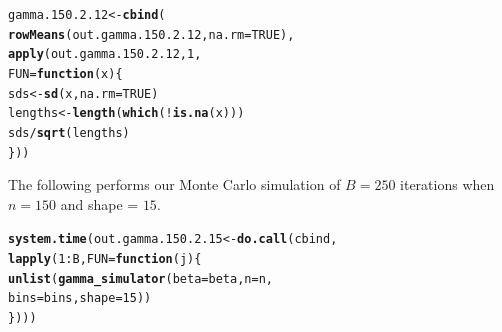 \documentclass[11pt]{article}\usepackage[]{graphicx}\usepackage[]{color}
\makeatletter
\newcommand{\hlnum}[1]{\textcolor[rgb]{0.686,0.059,0.569}{#1}}%
\newcommand{\hlopt}[1]{\textcolor[rgb]{0,0,0}{#1}}%
\newcommand{\hlstd}[1]{\textcolor[rgb]{0.345,0.345,0.345}{#1}}%
\newcommand{\hlkwa}[1]{\textcolor[rgb]{0.161,0.373,0.58}{\textbf{#1}}}%
\newcommand{\hlkwb}[1]{\textcolor[rgb]{0.69,0.353,0.396}{#1}}%
\newcommand{\hlkwc}[1]{\textcolor[rgb]{0.333,0.667,0.333}{#1}}%
\newcommand{\hlkwd}[1]{\textcolor[rgb]{0.737,0.353,0.396}{\textbf{#1}}}%
\newenvironment{kframe}{%
 \def\at@end@of@kframe{}%
 \ifinner\ifhmode%
  \def\at@end@of@kframe{\end{minipage}}%
  \begin{minipage}{\columnwidth}%
 \fi\fi%
 \def\FrameCommand##1{\hskip\@totalleftmargin \hskip-\fboxsep
 \colorbox{shadecolor}{##1}\hskip-\fboxsep
     \hskip-\linewidth \hskip-\@totalleftmargin \hskip\columnwidth}%
 \MakeFramed {\advance\hsize-\width
   \@totalleftmargin\z@ \linewidth\hsize
   \@setminipage}}%
 {\par\unskip\endMakeFramed%
 \at@end@of@kframe}
\newenvironment{knitrout}{}{} %
\makeatother
\begin{document}
\begin{knitrout}
\color{fgcolor}\begin{kframe}
\begin{alltt}
\hlstd{gamma.150.2.12} \hlkwb{<-} \hlkwd{cbind}\hlstd{(}
  \hlkwd{rowMeans}\hlstd{(out.gamma.150.2.12,} \hlkwc{na.rm} \hlstd{=} \hlnum{TRUE}\hlstd{),}
  \hlkwd{apply}\hlstd{(out.gamma.150.2.12,} \hlnum{1}\hlstd{,}
  \hlkwc{FUN} \hlstd{=} \hlkwa{function}\hlstd{(}\hlkwc{x}\hlstd{)\{}
    \hlstd{sds} \hlkwb{<-} \hlkwd{sd}\hlstd{(x,} \hlkwc{na.rm} \hlstd{=} \hlnum{TRUE}\hlstd{)}
    \hlstd{lengths} \hlkwb{<-} \hlkwd{length}\hlstd{(}\hlkwd{which}\hlstd{(}\hlopt{!}\hlkwd{is.na}\hlstd{(x)))}
    \hlstd{sds} \hlopt{/} \hlkwd{sqrt}\hlstd{(lengths)}
  \hlstd{\}))}
\end{alltt}


{\ttfamily\noindent\bfseries\color{errorcolor}{\#\# Error in is.data.frame(x): object 'out.gamma.150.2.12' not found}}\end{kframe}
\end{knitrout}

The following performs our Monte Carlo simulation of $B = 250$ iterations 
when $n = 150$ and shape = $15$.

\begin{knitrout}
\color{fgcolor}\begin{kframe}
\begin{alltt}
\hlkwd{system.time}\hlstd{(out.gamma.150.2.15} \hlkwb{<-} \hlkwd{do.call}\hlstd{(cbind,}
  \hlkwd{lapply}\hlstd{(}\hlnum{1}\hlopt{:}\hlstd{B,} \hlkwc{FUN} \hlstd{=} \hlkwa{function}\hlstd{(}\hlkwc{j}\hlstd{)\{}
    \hlkwd{unlist}\hlstd{(}\hlkwd{gamma_simulator}\hlstd{(}\hlkwc{beta} \hlstd{= beta,} \hlkwc{n} \hlstd{= n,}
      \hlkwc{bins} \hlstd{= bins,} \hlkwc{shape} \hlstd{=} \hlnum{15}\hlstd{))}
\hlstd{\})))}
\end{alltt}


{\ttfamily\noindent\bfseries\color{errorcolor}{\#\# Error in eval(predvars, data, env): object 'x1' not found}}

{\ttfamily\noindent\itshape\color{messagecolor}{\#\# Timing stopped at: 0.003 0 0.002}}\end{kframe}
\end{knitrout}
\end{document}
